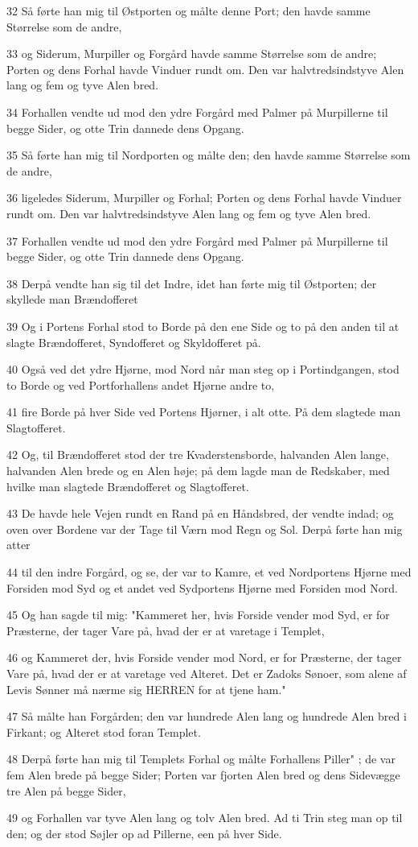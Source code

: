 \par 32 Så førte han mig til Østporten og målte denne Port; den havde samme Størrelse som de andre,
\par 33 og Siderum, Murpiller og Forgård havde samme Størrelse som de andre; Porten og dens Forhal havde Vinduer rundt om. Den var halvtredsindstyve Alen lang og fem og tyve Alen bred.
\par 34 Forhallen vendte ud mod den ydre Forgård med Palmer på Murpillerne til begge Sider, og otte Trin dannede dens Opgang.
\par 35 Så førte han mig til Nordporten og målte den; den havde samme Størrelse som de andre,
\par 36 ligeledes Siderum, Murpiller og Forhal; Porten og dens Forhal havde Vinduer rundt om. Den var halvtredsindstyve Alen lang og fem og tyve Alen bred.
\par 37 Forhallen vendte ud mod den ydre Forgård med Palmer på Murpillerne til begge Sider, og otte Trin dannede dens Opgang.
\par 38 Derpå vendte han sig til det Indre, idet han førte mig til Østporten; der skyllede man Brændofferet
\par 39 Og i Portens Forhal stod to Borde på den ene Side og to på den anden til at slagte Brændofferet, Syndofferet og Skyldofferet på.
\par 40 Også ved det ydre Hjørne, mod Nord når man steg op i Portindgangen, stod to Borde og ved Portforhallens andet Hjørne andre to,
\par 41 fire Borde på hver Side ved Portens Hjørner, i alt otte. På dem slagtede man Slagtofferet.
\par 42 Og, til Brændofferet stod der tre Kvaderstensborde, halvanden Alen lange, halvanden Alen brede og en Alen høje; på dem lagde man de Redskaber, med hvilke man slagtede Brændofferet og Slagtofferet.
\par 43 De havde hele Vejen rundt en Rand på en Håndsbred, der vendte indad; og oven over Bordene var der Tage til Værn mod Regn og Sol. Derpå førte han mig atter
\par 44 til den indre Forgård, og se, der var to Kamre, et ved Nordportens Hjørne med Forsiden mod Syd og et andet ved Sydportens Hjørne med Forsiden mod Nord.
\par 45 Og han sagde til mig: "Kammeret her, hvis Forside vender mod Syd, er for Præsterne, der tager Vare på, hvad der er at varetage i Templet,
\par 46 og Kammeret der, hvis Forside vender mod Nord, er for Præsterne, der tager Vare på, hvad der er at varetage ved Alteret. Det er Zadoks Sønoer, som alene af Levis Sønner må nærme sig HERREN for at tjene ham."
\par 47 Så målte han Forgården; den var hundrede Alen lang og hundrede Alen bred i Firkant; og Alteret stod foran Templet.
\par 48 Derpå førte han mig til Templets Forhal og målte Forhallens Piller" ; de var fem Alen brede på begge Sider; Porten var fjorten Alen bred og dens Sidevægge tre Alen på begge Sider,
\par 49 og Forhallen var tyve Alen lang og tolv Alen bred. Ad ti Trin steg man op til den; og der stod Søjler op ad Pillerne, een på hver Side.

